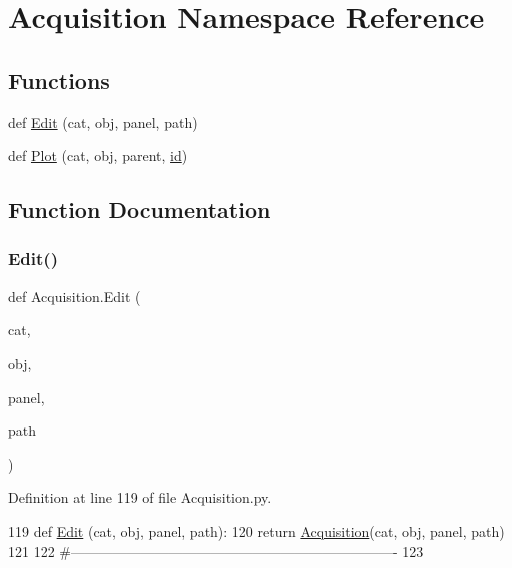 \hypertarget{namespaceAcquisition}{}\section{Acquisition Namespace Reference}
\label{namespaceAcquisition}
\subsection*{Functions}
\begin{DoxyCompactItemize}
\item 
def \hyperlink{namespaceAcquisition_ae22e0bd9de0d84e8fcb0da5037e2c700}{Edit} (cat, obj, panel, path)
\item 
def \hyperlink{namespaceAcquisition_a0e0ed7939299c431d7eceb1dde96fa07}{Plot} (cat, obj, parent, \hyperlink{classObject_af99145335cc61ff6e2798ea17db009d2}{id})
\end{DoxyCompactItemize}


\subsection{Function Documentation}
\mbox{\label{namespaceAcquisition_ae22e0bd9de0d84e8fcb0da5037e2c700}} 
\subsubsection{\texorpdfstring{Edit()}{Edit()}}
{\footnotesize\ttfamily def Acquisition.\+Edit (\begin{DoxyParamCaption}\item[{}]{cat,  }\item[{}]{obj,  }\item[{}]{panel,  }\item[{}]{path }\end{DoxyParamCaption})}



Definition at line 119 of file Acquisition.\+py.


\begin{DoxyCode}
119 \textcolor{keyword}{def }\hyperlink{namespaceAcquisition_ae22e0bd9de0d84e8fcb0da5037e2c700}{Edit} (cat, obj, panel, path):
120     \textcolor{keywordflow}{return} \hyperlink{classAcquisition}{Acquisition}(cat, obj, panel, path)
121 
122 \textcolor{comment}{#----------------------------------------------------------------------}
123 
\end{DoxyCode}
\mbox{\label{namespaceAcquisition_a0e0ed7939299c431d7eceb1dde96fa07}} 
